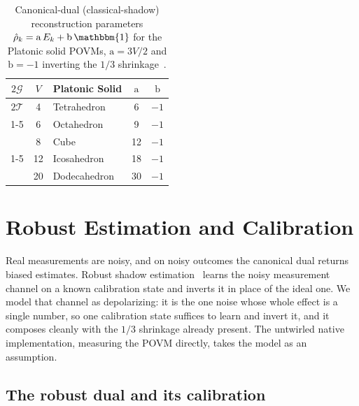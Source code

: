 \documentclass[11pt, oneside, openany]{scrbook}
\newcommand{\Id}{\mathbbm{1}}
\newcommand{\Tgroup}{\mathcal{T}}  %
\newcommand{\Ogroup}{\mathcal{O}}  %
\newcommand{\Igroup}{\mathcal{I}}  %
\newcommand{\Ggroup}{\mathcal{G}}
\newcommand{\TwoT}{2\Tgroup}
\newcommand{\TwoO}{2\Ogroup}
\newcommand{\TwoI}{2\Igroup}
\newcommand{\TwoG}{2\Ggroup}
\begin{document}
\begin{table}[H]
\centering
\begin{tabular}{c c l c c}
\toprule
$\TwoG$ & $V$ & Platonic Solid & $\mathrm a$ & $\mathrm b$ \\
\midrule
$\TwoT$                  & 4  & Tetrahedron  & 6  & $-1$ \\
\cmidrule(lr){1-5}
\multirow{2}{*}{$\TwoO$} & 6  & Octahedron   & 9  & $-1$ \\
                         & 8  & Cube         & 12 & $-1$ \\
\cmidrule(lr){1-5}
\multirow{2}{*}{$\TwoI$} & 12 & Icosahedron  & 18 & $-1$ \\
                         & 20 & Dodecahedron & 30 & $-1$ \\
\bottomrule
\end{tabular}
\caption{Canonical-dual (classical-shadow) reconstruction parameters $\hat\rho_k = \mathrm a\, E_k + \mathrm b\,\Id$ for the Platonic solid POVMs, $\mathrm a = 3V/2$ and $\mathrm b = -1$ inverting the $1/3$ shrinkage~\cite{nguyen2022optimisingshadowtomography, nguyen2020symmetriesmeasurementsquantum}.}
\label{tab:shadow-reconstruction}
\end{table}

\section{Robust Estimation and Calibration} \label{sec:shadows:robust}

Real measurements are noisy, and on noisy outcomes the canonical dual returns biased estimates. Robust shadow estimation~\cite{chen2021robustshadowestimationa} learns the noisy measurement channel on a known calibration state and inverts it in place of the ideal one. We model that channel as depolarizing: it is the one noise whose whole effect is a single number, so one calibration state suffices to learn and invert it, and it composes cleanly with the $1/3$ shrinkage already present. The untwirled native implementation, measuring the POVM directly, takes the model as an assumption.

\subsection{The robust dual and its calibration} \label{sec:shadows:calibration}
\end{document}
